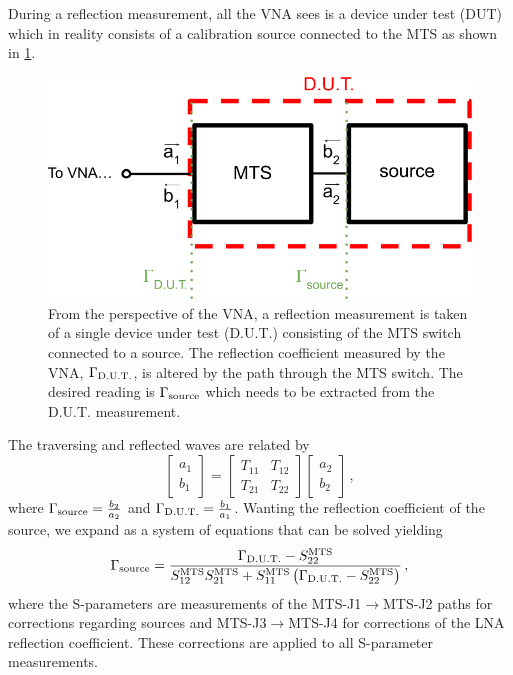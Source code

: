 During a reflection measurement, all the VNA sees is a device under test (DUT) which in reality consists of a calibration source connected to the MTS as shown in \cref{fig:cascaded_network_diagram}. 
\begin{figure}
    \centering
    \includegraphics[width=.9\textwidth]{cascaded_network_diagram}
    \caption{From the perspective of the VNA, a reflection measurement is taken of a single device under test (D.U.T.) consisting of the MTS switch connected to a source. The reflection coefficient measured by the VNA, $\Gamma_{\mathrm{\mathrm{D.U.T.}}}$, is altered by the path through the MTS switch. The desired reading is $\Gamma_{\mathrm{\mathrm{source}}}$ which needs to be extracted from the D.U.T. measurement.}
    \label{fig:cascaded_network_diagram}
\end{figure}
The traversing and reflected waves are related by
\begin{equation}
    \begin{bmatrix}
        a_1 \\ b_1
    \end{bmatrix}
    =
    \begin{bmatrix}
        T_{11} & T_{12} \\
        T_{21} & T_{22}
    \end{bmatrix}
    \begin{bmatrix}
        a_2 \\ b_2
    \end{bmatrix} \,,
\end{equation}
where $\Gamma_{\mathrm{\mathrm{source}}} = \frac{b_2}{a_2}$ and $\Gamma_{\mathrm{\mathrm{D.U.T.}}} = \frac{b_1}{a_1}$. Wanting the reflection coefficient of the source, we expand as a system of equations that can be solved yielding
\begin{equation}
    \Gamma_{\mathrm{source}} = \frac{ \Gamma_{\mathrm{\mathrm{D.U.T.}}} - S_{22}^{\mathrm{MTS}} }{ S_{12}^{\mathrm{MTS}} S_{21}^{\mathrm{MTS}} + S_{11}^{\mathrm{MTS}} \left( \Gamma_{\mathrm{\mathrm{D.U.T.}}} - S_{22}^{\mathrm{MTS}} \right) } \,,
\end{equation}
where the S-parameters are measurements of the MTS-J1$\rightarrow$MTS-J2 paths for corrections regarding sources and MTS-J3$\rightarrow$MTS-J4 for corrections of the LNA reflection coefficient. These corrections are applied to all S-parameter measurements.

